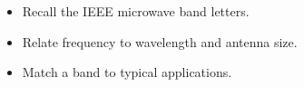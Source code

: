 \begin{objectives}
\begin{itemize}[leftmargin=1.4em,itemsep=2pt]
\item Recall the IEEE microwave band letters.
\item Relate frequency to wavelength and antenna size.
\item Match a band to typical applications.
\end{itemize}
\end{objectives}
